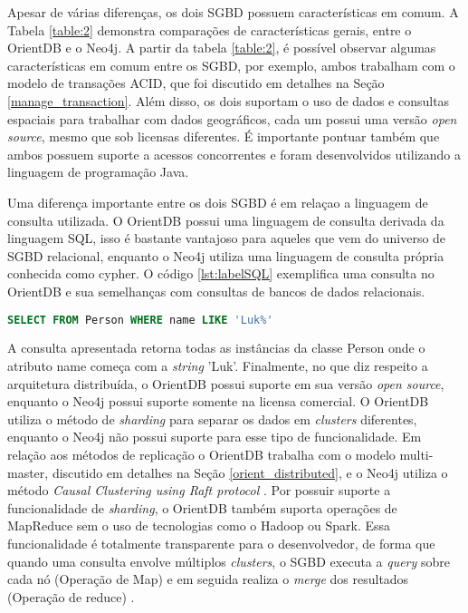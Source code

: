 	Apesar de várias diferenças, os dois SGBD possuem características em comum. A Tabela \ref{table:2} demonstra comparações de características gerais, entre o OrientDB e o Neo4j. A partir da tabela \ref{table:2}, é possível observar algumas características em comum entre os SGBD, por exemplo, ambos trabalham com o modelo de transações ACID, que foi discutido em detalhes na Seção \ref{manage_transaction}. Além disso, os dois suportam o uso de dados e consultas espaciais para trabalhar com dados geográficos, cada um possui uma versão \textit{open source}, mesmo que sob licensas diferentes. É importante pontuar também que ambos possuem suporte a acessos concorrentes e foram desenvolvidos utilizando a linguagem de programação Java.
	
	Uma diferença importante entre os dois SGBD é em relaçao a linguagem de consulta utilizada. O OrientDB possui uma linguagem de consulta derivada da linguagem SQL, isso é bastante vantajoso para aqueles que vem do universo de SGBD relacional, enquanto o Neo4j utiliza uma linguagem de consulta própria conhecida como cypher. O código \ref{lst:labelSQL} exemplifica uma consulta no OrientDB e sua semelhanças com consultas de bancos de dados relacionais.
	
\begin{lstlisting}[label={lst:labelSQL}, caption={Exemplo de consulta no SGBD OrientDB},captionpos=b, language=sql]
SELECT FROM Person WHERE name LIKE 'Luk%'
\end{lstlisting}

	A consulta apresentada retorna todas as instâncias da classe Person onde o atributo name começa com a \textit{string} 'Luk'. Finalmente, no que diz respeito a arquitetura distribuída, o OrientDB possui suporte em sua versão \textit{open source}, enquanto o Neo4j possui suporte somente na licensa comercial. O OrientDB utiliza o método de \textit{sharding} para separar os dados em \textit{clusters} diferentes, enquanto o Neo4j não possui suporte para esse tipo de funcionalidade. Em relação aos métodos de replicação o OrientDB trabalha com o modelo multi-master, discutido em detalhes na Seção \ref{orient_distributed}, e o Neo4j utiliza o método \textit{Causal Clustering using Raft protocol} \cite{neo4jcausal}. Por possuir suporte a funcionalidade de \textit{sharding}, o OrientDB também suporta operações de MapReduce sem o uso de tecnologias como o Hadoop ou Spark. Essa funcionalidade é totalmente transparente para o desenvolvedor, de forma que quando uma consulta envolve múltiplos \textit{clusters}, o SGBD executa a \textit{query} sobre cada nó (Operação de Map) e em seguida realiza o \textit{merge} dos resultados (Operação de reduce) \cite{orientMapReduce}.	

